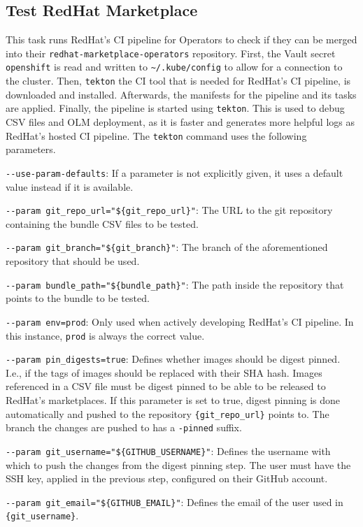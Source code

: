 \subsection{Test RedHat Marketplace}\label{subsec:test-redhat-marketplace}

This task runs RedHat's CI pipeline for Operators to check if they can be merged into their \verb|redhat-marketplace-operators| repository.
First, the Vault secret \verb|openshift| is read and written to \verb|~/.kube/config| to allow for a connection to the cluster.
Then, \verb|tekton| the CI tool that is needed for RedHat's CI pipeline, is downloaded and installed.
Afterwards, the manifests for the pipeline and its tasks are applied.
Finally, the pipeline is started using \verb|tekton|.
This is used to debug CSV files and OLM deployment, as it is faster and generates more helpful logs as RedHat's hosted CI pipeline.
The \verb|tekton| command uses the following parameters.

\verb|--use-param-defaults|: If a parameter is not explicitly given, it uses a default value instead if it is available.

\verb|--param git_repo_url="${git_repo_url}"|: The URL to the git repository containing the bundle CSV files to be tested.

\verb|--param git_branch="${git_branch}"|: The branch of the aforementioned repository that should be used.

\verb|--param bundle_path="${bundle_path}"|: The path inside the repository that points to the bundle to be tested.

\verb|--param env=prod|: Only used when actively developing RedHat's CI pipeline.
In this instance, \verb|prod| is always the correct value.

\verb|--param pin_digests=true|: Defines whether images should be digest pinned.
I.e., if the tags of images should be replaced with their SHA hash.
Images referenced in a CSV file must be digest pinned to be able to be released to RedHat's marketplaces.
If this parameter is set to true, digest pinning is done automatically and pushed to the repository \verb|{git_repo_url}| points to.
The branch the changes are pushed to has a \verb|-pinned| suffix.

\verb|--param git_username="${GITHUB_USERNAME}"|: Defines the username with which to push the changes from the digest pinning step.
The user must have the SSH key, applied in the previous step, configured on their GitHub account.

\verb|--param git_email="${GITHUB_EMAIL}"|: Defines the email of the user used in \verb|{git_username}|.

